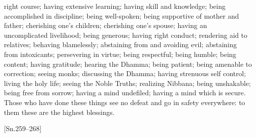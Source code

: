 right course; having extensive learning; having
skill and knowledge; being accomplished in
discipline; being well-spoken; being supportive
of mother and father; cherishing one's children; cherishing one's spouse; having an
uncomplicated livelihood; being generous;
having right conduct; rendering aid to relatives; behaving blamelessly; abstaining from
and avoiding evil; abstaining from intoxicants;
persevering in virtue; being respectful; being
humble; being content; having gratitude; hearing the Dhamma; being patient; being amenable to correction; seeing monks; discussing the
Dhamma; having strenuous self control; living
the holy life; seeing the Noble Truths; realizing
Nibbana; being unshakable; being free from
sorrow; having a mind undefiled; having a
mind which is secure.
Those who have done these things see no
defeat and go in safety everywhere: to them
these are the highest blessings.

[Sn.259–268]

